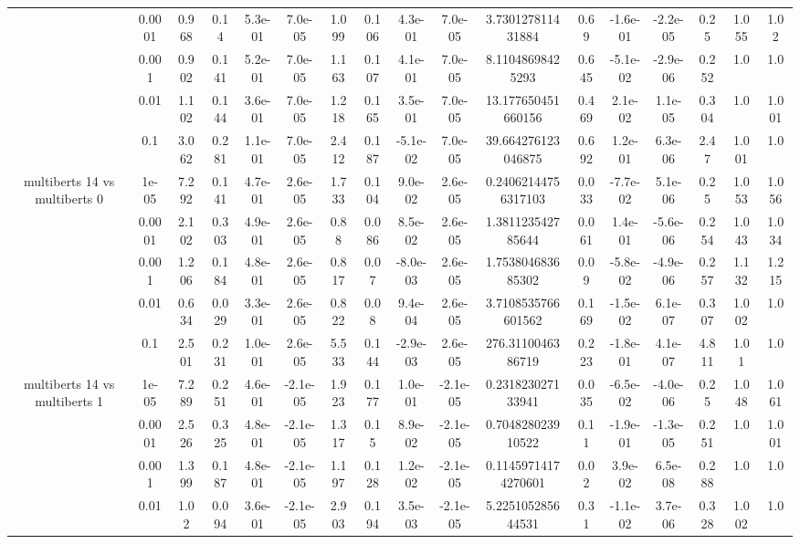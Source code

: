\begin{tabular}{|c|c|c|c|c|c|c|c|c|c|c|c|c|c|c|c|c|}
 & 0.0001 & 0.968 & 0.14 & 5.3e-01 & 7.0e-05 & 1.099 & 0.106 & 4.3e-01 & 7.0e-05 & 3.730127811431884 & 0.69 & -1.6e-01 & -2.2e-05 & 0.25 & 1.055 & 1.02 \\
 & 0.001 & 0.902 & 0.141 & 5.2e-01 & 7.0e-05 & 1.163 & 0.107 & 4.1e-01 & 7.0e-05 & 8.11048698425293 & 0.645 & -5.1e-02 & -2.9e-06 & 0.252 & 1.0 & 1.0 \\
 & 0.01 & 1.102 & 0.144 & 3.6e-01 & 7.0e-05 & 1.218 & 0.165 & 3.5e-01 & 7.0e-05 & 13.177650451660156 & 0.469 & 2.1e-02 & 1.1e-05 & 0.304 & 1.0 & 1.001 \\
 & 0.1 & 3.062 & 0.281 & 1.1e-01 & 7.0e-05 & 2.412 & 0.187 & -5.1e-02 & 7.0e-05 & 39.664276123046875 & 0.692 & 1.2e-01 & 6.3e-06 & 2.47 & 1.001 & 1.0 \\
\hline
\multirow{5}{*}{multiberts 14 vs multiberts 0} & 1e-05 & 7.292 & 0.141 & 4.7e-01 & 2.6e-05 & 1.733 & 0.104 & 9.0e-02 & 2.6e-05 & 0.24062144756317103 & 0.033 & -7.7e-02 & 5.1e-06 & 0.25 & 1.053 & 1.056 \\
 & 0.0001 & 2.102 & 0.303 & 4.9e-01 & 2.6e-05 & 0.88 & 0.086 & 8.5e-02 & 2.6e-05 & 1.381123542785644 & 0.061 & 1.4e-01 & -5.6e-06 & 0.254 & 1.043 & 1.034 \\
 & 0.001 & 1.206 & 0.184 & 4.8e-01 & 2.6e-05 & 0.817 & 0.07 & -8.0e-03 & 2.6e-05 & 1.753804683685302 & 0.09 & -5.8e-02 & -4.9e-06 & 0.257 & 1.132 & 1.215 \\
 & 0.01 & 0.634 & 0.029 & 3.3e-01 & 2.6e-05 & 0.822 & 0.08 & 9.4e-04 & 2.6e-05 & 3.7108535766601562 & 0.169 & -1.5e-02 & 6.1e-07 & 0.307 & 1.002 & 1.0 \\
 & 0.1 & 2.501 & 0.231 & 1.0e-01 & 2.6e-05 & 5.533 & 0.144 & -2.9e-03 & 2.6e-05 & 276.3110046386719 & 0.223 & -1.8e-01 & 4.1e-07 & 4.811 & 1.01 & 1.0 \\
\hline
\multirow{5}{*}{multiberts 14 vs multiberts 1} & 1e-05 & 7.289 & 0.251 & 4.6e-01 & -2.1e-05 & 1.923 & 0.177 & 1.0e-01 & -2.1e-05 & 0.231823027133941 & 0.035 & -6.5e-02 & -4.0e-06 & 0.25 & 1.048 & 1.061 \\
 & 0.0001 & 2.526 & 0.325 & 4.8e-01 & -2.1e-05 & 1.317 & 0.15 & 8.9e-02 & -2.1e-05 & 0.704828023910522 & 0.11 & -1.9e-01 & -1.3e-05 & 0.251 & 1.0 & 1.001 \\
 & 0.001 & 1.399 & 0.187 & 4.8e-01 & -2.1e-05 & 1.197 & 0.128 & 1.2e-02 & -2.1e-05 & 0.11459714174270601 & 0.02 & 3.9e-02 & 6.5e-08 & 0.288 & 1.0 & 1.0 \\
 & 0.01 & 1.02 & 0.094 & 3.6e-01 & -2.1e-05 & 2.903 & 0.194 & 3.5e-03 & -2.1e-05 & 5.225105285644531 & 0.31 & -1.1e-02 & 3.7e-06 & 0.328 & 1.002 & 1.0 \\

\end{tabular}
